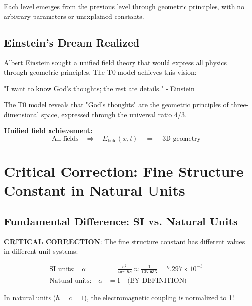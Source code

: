 \documentclass[12pt,a4paper]{report}
\begin{document}
Each level emerges from the previous level through geometric principles, with no arbitrary parameters or unexplained constants.

\subsection{Einstein's Dream Realized}
\label{subsec:einstein_dream}

Albert Einstein sought a unified field theory that would express all physics through geometric principles. The T0 model achieves this vision:

\begin{tcolorbox}[colback=green!5!white,colframe=green!75!black,title=Einstein's Vision Realized]
	"I want to know God's thoughts; the rest are details." - Einstein
	
	The T0 model reveals that "God's thoughts" are the geometric principles of three-dimensional space, expressed through the universal ratio 4/3.
\end{tcolorbox}

\textbf{Unified field achievement:}
\begin{equation}
	\text{All fields} \quad \Rightarrow \quad E_{\text{field}}(x,t) \quad \Rightarrow \quad \text{3D geometry}
\end{equation}

\section{Critical Correction: Fine Structure Constant in Natural Units}
\label{sec:fine_structure_correction}

\subsection{Fundamental Difference: SI vs. Natural Units}
\label{subsec:si_vs_natural_units}

\textbf{CRITICAL CORRECTION:} The fine structure constant has different values in different unit systems:

\begin{tcolorbox}[colback=red!10!white,colframe=red!75!black,title=CRITICAL POINT]
	\begin{align}
		\text{SI units:} \quad \alpha &= \frac{e^2}{4\pi\epsilon_0\hbar c} \approx \frac{1}{137.036} = 7.297 \times 10^{-3} \\
		\text{Natural units:} \quad \alpha &= 1 \quad \text{(BY DEFINITION)}
	\end{align}
	
	In natural units ($\hbar = c = 1$), the electromagnetic coupling is normalized to 1!
\end{tcolorbox}
\end{document}
